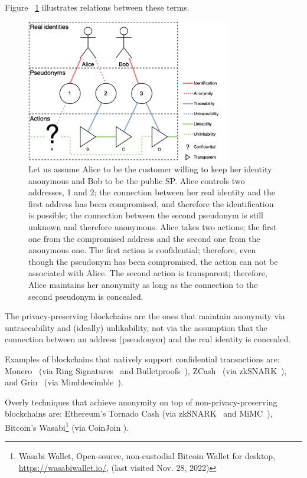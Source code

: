 Figure ~\ref{fig:anonymity-diagram} illustrates relations between these terms.

\begin{figure}[h!]
\includegraphics[width=9cm]{anonymity-diagram.png}
\centering
\caption{Let us assume Alice to be the customer willing to keep her identity anonymous and Bob to be the public SP. Alice controls two addresses, 1 and 2; the connection between her real identity and the first address has been compromised, and therefore the identification is possible; the connection between the second pseudonym is still unknown and therefore anonymous. Alice takes two actions; the first one from the compromised address and the second one from the anonymous one. The first action is confidential; therefore, even though the pseudonym has been compromised, the action can not be associated with Alice. The second action is transparent; therefore, Alice maintains her anonymity as long as the connection to the second pseudonym is concealed.}

\label{fig:anonymity-diagram}
\end{figure}

The privacy-preserving blockchains are the ones that maintain anonymity via untraceability and (ideally) unlikability, not via the assumption that the connection between an address (pseudonym) and the real identity is concealed.   

Examples of blockchains that natively support confidential transactions are: Monero~\cite{vansaberhagenCryptoNote2013} (via Ring Signatures~\cite{noetherRingSignatureConfidential2015} and Bulletproofs~\cite{bunzBulletproofsShortProofs2018}), ZCash~\cite{ben-sassonZerocashDecentralizedAnonymous2014} (via zkSNARK~\cite{ben-sassonSNARKsVerifyingProgram2013}), and Grin~\cite{fuchsbauerAggregateCashSystems2019} (via Mimblewimble~\cite{jedusorMIMBLEWIMBLE2016}).

Overly techniques that achieve anonymity on top of non-privacy-preserving blockchains are: Ethereum's Tornado Cash\cite{pertsevTornadoCashPrivacy2019} (via zkSNARK~\cite{grothSizePairingbasedNoninteractive2016} and MiMC~\cite{albrechtMiMCEfficientEncryption2016}), Bitcoin's Wasabi\footnote{Wasabi Wallet, Open-source, non-custodial Bitcoin Wallet for desktop, \url{https://wasabiwallet.io/}, (last visited Nov. 28, 2022)} (via CoinJoin \cite{maxwellCoinJoinBitcoinPrivacy2013}).


